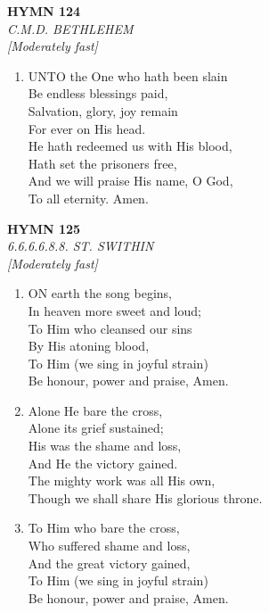 \documentclass[11pt,a4paper]{article}
\begin{document}
\newpage
\begin{center}
    {\Large \textbf{HYMN 124}}
    \\
    \textit{C.M.D. BETHLEHEM}
    \\
    \textit{\small [Moderately fast]}
\end{center}
\vspace{1em}

\begin{enumerate}
    \item UNTO the One who hath been slain \\
        Be endless blessings paid, \\
        Salvation, glory, joy remain \\
        For ever on His head. \\
        He hath redeemed us with His blood, \\
        Hath set the prisoners free, \\
        And we will praise His name, O God, \\
        To all eternity. Amen.

\end{enumerate}

\newpage
\begin{center}
    {\Large \textbf{HYMN 125}}
    \\
    \textit{6.6.6.6.8.8. ST. SWITHIN}
    \\
    \textit{\small [Moderately fast]}
\end{center}
\vspace{1em}

\begin{enumerate}
    \item ON earth the song begins, \\
        In heaven more sweet and loud; \\
        To Him who cleansed our sins \\
        By His atoning blood, \\
        To Him (we sing in joyful strain) \\
        Be honour, power and praise, Amen.

    \item Alone He bare the cross, \\
        Alone its grief sustained; \\
        His was the shame and loss, \\
        And He the victory gained. \\
        The mighty work was all His own, \\
        Though we shall share His glorious throne.

    \item To Him who bare the cross, \\
        Who suffered shame and loss, \\
        And the great victory gained, \\
        To Him (we sing in joyful strain) \\
        Be honour, power and praise, Amen.

\end{enumerate}
\end{document}
